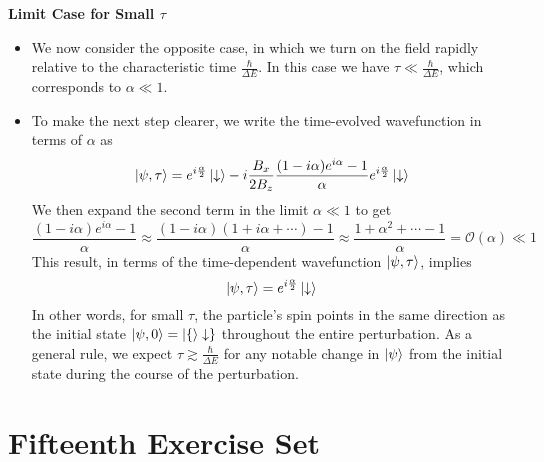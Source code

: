 \documentclass[11pt, a4paper]{article}
\newcommand{\p}{\psi}  %
\newcommand{\da}{\downarrow}  %
\begin{document}
\textbf{Limit Case for Small $ \tau $ }
\begin{itemize}

	\item We now consider the opposite case, in which we turn on the field rapidly relative to the characteristic time $ \frac{\hbar}{\Delta E}  $. In this case we have $ \tau \ll \frac{\hbar}{\Delta E} $, which corresponds to $ \alpha \ll 1 $. 

    \item To make the next step clearer, we write the time-evolved wavefunction in terms of $ \alpha $ as 
    \begin{equation*}
        \ket{\p, \tau} = e^{i \frac{\alpha}{2} }\ket{\da} - i \frac{B_{x}}{2B_{z}} \frac{(1 - i \alpha)e^{i\alpha} - 1}{\alpha} e^{i \frac{\alpha}{2} }\ket{\da}
    \end{equation*}
    We then expand the second term in the limit $ \alpha \ll 1 $ to get
	\begin{equation*}
		\frac{(1 - i\alpha)e^{i\alpha} - 1}{\alpha} \approx \frac{(1 - i \alpha)(1 + i \alpha + \cdots) - 1}{\alpha} \approx \frac{1 + \alpha^{2} + \cdots - 1}{\alpha} = \mathcal{O}(\alpha) \ll 1
	\end{equation*}
    This result, in terms of the time-dependent wavefunction $ \ket{\p, \tau} $, implies
	\begin{equation*}
		\ket{\p, \tau} = e^{i\frac{\alpha}{2}}\ket{\da}
	\end{equation*}
    In other words, for small $ \tau $, the particle's spin points in the same direction as the initial state $ \ket{\p, 0} = \ket\{\da\} $ throughout the entire perturbation. As a general rule, we expect $ \tau \gtrsim \frac{\hbar}{\Delta E} $ for any notable change in $ \ket{\p} $ from the initial state during the course of the perturbation.
\end{itemize}

\section{Fifteenth Exercise Set}
\end{document}

